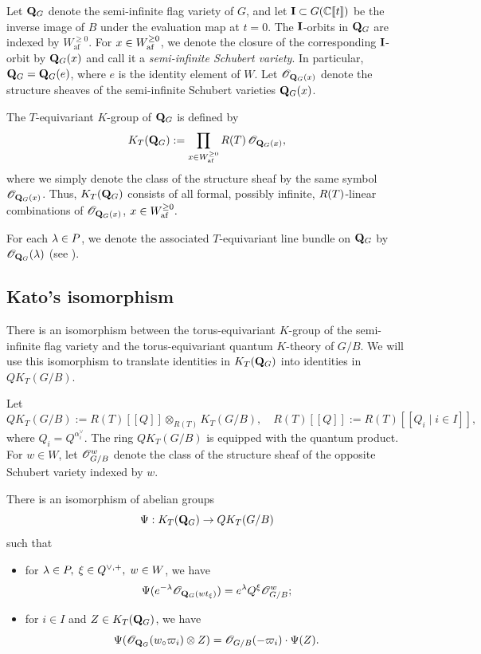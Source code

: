 \documentclass{amsart}
\numberwithin{equation}{section}
\begin{document}
Let $\mathbf{Q}_G$ denote the semi-infinite flag variety of $G$, and let
$\mathbf{I}\subset G(\mathbb{C}[\![t]\!])$ be the inverse image of $B$ under the
evaluation map at $t=0$.
The $\mathbf{I}$-orbits in $\mathbf{Q}_G$ are indexed by
$W_{\mathrm{af}}^{\geq0}$.
For $x\in W_{\mathrm{af}}^{\ge 0}$, we denote the closure of the corresponding
$\mathbf{I}$-orbit by $\mathbf{Q}_G(x)$ and call it a \emph{semi-infinite Schubert
variety}.  In particular, $\mathbf{Q}_G=\mathbf{Q}_G(e)$, where $e$ is the identity element of $W$.
Let $\mathscr{O}_{\mathbf{Q}_G(x)}$ denote the structure
sheaves of the semi-infinite Schubert varieties $\mathbf{Q}_G(x)$.

The $T$-equivariant $K$-group of $\mathbf{Q}_G$ is defined by
\[
  K_T(\mathbf{Q}_G)
  :=
  \prod_{x\in W_{\mathrm{af}}^{\ge 0}}
  R(T)\,\mathscr{O}_{\mathbf{Q}_G(x)},
\]
where we simply denote
the class of the structure sheaf by the same symbol
$\mathscr{O}_{\mathbf{Q}_G(x)}$.
Thus, $K_T(\mathbf{Q}_G)$ consists of all formal, possibly infinite,
$R(T)$-linear combinations of $\mathscr{O}_{\mathbf{Q}_G(x)}$, $x\in W_{\mathrm{af}}^{\ge 0}.$ 


For each $\lambda\in P$, we denote the associated $T$-equivariant line bundle on $\mathbf{Q}_G$
by $\mathscr{O}_{\mathbf{Q}_G}(\lambda)$ (see \cite[\S~3.1]{MNS1}).
\subsection{Kato's isomorphism}
There is an isomorphism between the torus-equivariant \(K\)-group of the
semi-infinite flag variety and the torus-equivariant quantum \(K\)-theory of
\(G/B\). We will use this isomorphism to translate identities in
\(K_T(\mathbf{Q}_G)\) into identities in \(QK_T(G/B)\).

Let
\[
  QK_T(G/B)
  :=R(T)[\![Q]\!]
  \otimes_{R(T)}K_T(G/B),
  \quad
  R(T)[\![Q]\!]
  :=
  R(T)[\![Q_i\mid i\in I]\!],
\]
where $Q_i=Q^{\alpha_i^\lor}$.
The ring $QK_T(G/B)$ is equipped with the quantum product.  For $w\in W$, let $\mathscr{O}_{G/B}^w$ denote the class of the structure
sheaf of the opposite Schubert variety indexed by $w$.

\begin{thm}
\label{thm:Kato}
There is an isomorphism of abelian groups
\begin{equation}
\Psi: 
K_T(\mathbf{Q}_G)
\rightarrow
QK_T(G/B)
\end{equation}
such that 
\begin{itemize}
    \item[(i)] for $\lambda\in P,\;\xi\in Q^{\lor,+},\;
w\in W$, we have
\begin{equation}
\Psi(    e^{-\lambda}\mathscr{O}_{\mathbf{Q}_G(wt_\xi)})=e^\lambda Q^\xi 
\mathscr{O}_{G/B}^{w}; \label{eq:Psi_COQ}
\end{equation} 
\item[(ii)] for $i \in I$ and ${Z} \in K_T(\mathbf{Q}_G)$, we have 
\begin{equation} \label{eq:comm_fundamental}
    \Psi(\mathscr{O}_{\mathbf{Q}_G}(w_{\circ} {\varpi_{i}}) \otimes {Z}) = \mathscr{O}_{G/B}(-{\varpi_{i}}) \cdot \Psi({Z}). 
\end{equation}
\end{itemize}
\end{thm}
\end{document}
